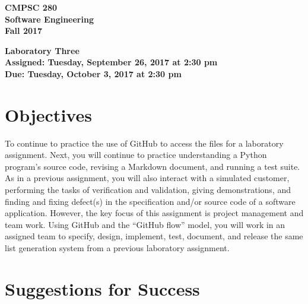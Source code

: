\documentclass[11pt]{article}
\newcommand{\assignmentduedate}{October 3}
\newcommand{\assignmentassignedate}{September 26}
\newcommand{\assignmentnumber}{Three}
\newcommand{\labyear}{2017}
\newcommand{\labday}{Tuesday}
\newcommand{\labtime}{2:30 pm}
\newcommand{\assigneddate}{Assigned: \labday, \assignmentassignedate, \labyear{} at \labtime{}}
\newcommand{\duedate}{Due: \labday, \assignmentduedate, \labyear{} at \labtime{}}
\newcommand{\labtitle}[1]
{
  \begin{center}
    \begin{center}
      \bf
      CMPSC 280\\Software Engineering\\
      Fall 2017\\
      \medskip
    \end{center}
    \bf
    #1
  \end{center}
}
\begin{document}
\thispagestyle{empty}

\labtitle{Laboratory \assignmentnumber{} \\ \assigneddate{} \\ \duedate{}}

\section*{Objectives}

To continue to practice the use of GitHub to access the files for a laboratory assignment. Next, you will continue to
practice understanding a Python program's source code, revising a Markdown document, and running a test suite. As in a
previous assignment, you will also interact with a simulated customer, performing the tasks of verification and
validation, giving demonstrations, and finding and fixing defect(s) in the specification and/or source code of a
software application. However, the key focus of this assignment is project management and team work. Using GitHub and
the ``GitHub flow'' model, you will work in an assigned team to specify, design, implement, test, document, and release
the same list generation system from a previous laboratory assignment.

\section*{Suggestions for Success}
\end{document}
